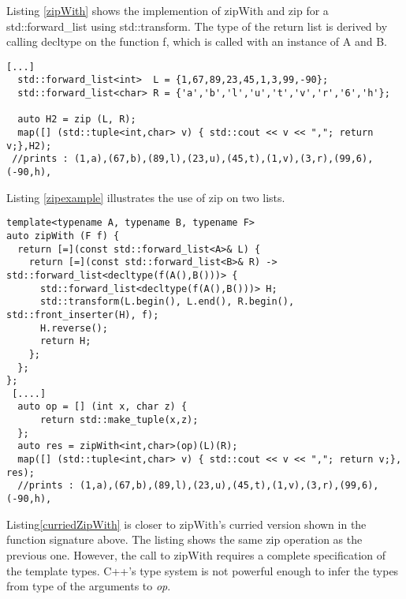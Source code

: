 \documentclass[12pt,fleqn]{article}
\begin{document}
Listing \ref{zipWith} shows the implemention of zipWith and zip for a std::forward\_list using std::transform.
The type of the return list is derived by calling decltype on the function f, which is called with an instance of A and B.

\begin{lstlisting}[caption=zipping two lists, label=zipexample ]
   [...]
  std::forward_list<int>  L = {1,67,89,23,45,1,3,99,-90};
  std::forward_list<char> R = {'a','b','l','u','t','v','r','6','h'};

  auto H2 = zip (L, R);
  map([] (std::tuple<int,char> v) { std::cout << v << ","; return v;},H2); 
 //prints : (1,a),(67,b),(89,l),(23,u),(45,t),(1,v),(3,r),(99,6),(-90,h),
\end{lstlisting}
Listing \ref{zipexample} illustrates the use of zip on two lists.

\begin{lstlisting}[caption=curried version of zipWith, label=curriedZipWith]
template<typename A, typename B, typename F>
auto zipWith (F f) {
  return [=](const std::forward_list<A>& L) {
    return [=](const std::forward_list<B>& R) -> std::forward_list<decltype(f(A(),B()))> {
      std::forward_list<decltype(f(A(),B()))> H;
      std::transform(L.begin(), L.end(), R.begin(), std::front_inserter(H), f);
      H.reverse();
      return H;
    };
  };
};
 [....]
  auto op = [] (int x, char z) {
      return std::make_tuple(x,z);
  };
  auto res = zipWith<int,char>(op)(L)(R);
  map([] (std::tuple<int,char> v) { std::cout << v << ","; return v;}, res);
  //prints : (1,a),(67,b),(89,l),(23,u),(45,t),(1,v),(3,r),(99,6),(-90,h),
\end{lstlisting}
Listing\ref{curriedZipWith} is closer to zipWith's curried version shown in the function signature above.
The listing shows the same zip operation as the previous one.
However, the call to zipWith requires a complete specification of the template types.
C++'s type system is not powerful enough to infer the types from type of the arguments to {\em op}.


\end{document}
